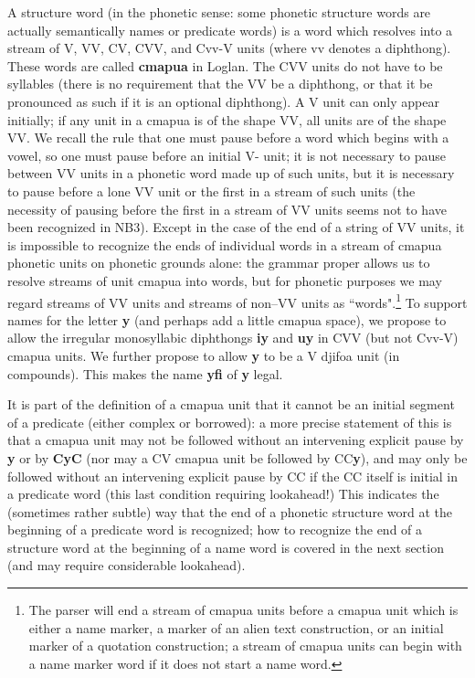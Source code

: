 \documentclass[12pt]{book}
\begin{document}
A structure word (in the phonetic sense:  some phonetic structure words are actually semantically names or predicate words)  is a word which resolves into a stream of
V, VV, CV, CVV, and Cvv-V units (where vv denotes a diphthong).  These words are called {\bf cmapua} in Loglan.  The CVV units do not have to be syllables (there is no requirement
that the VV be a diphthong, or that it be pronounced as such if it is an optional diphthong).  A V unit can only appear initially;  if any unit in a cmapua is of the shape VV, all units are of the shape VV.  We recall the rule that one must pause before
a word which begins with a vowel, so one must pause before an initial V- unit;  it is not necessary to pause between VV units in a phonetic word made up of such units, but it is necessary to pause before a lone VV unit or the first in a stream of such units (the necessity of pausing before the first in a stream of VV units seems not to have been recognized in NB3).  Except in the case of the end of a string of VV units, it is impossible to recognize the ends of individual words in a stream of cmapua phonetic units on phonetic grounds alone:  the grammar proper allows us to resolve streams of unit cmapua into words, but for phonetic purposes we may regard streams of VV units and streams of non--VV units as ``words".\footnote{The parser will end a stream of cmapua units before a cmapua unit which is either a name marker, a marker of an alien text construction, or an initial marker of a quotation construction; a stream of cmapua units can begin with a name marker word if it does not start a name word.}  
To support names for the letter {\bf y} (and perhaps add a little cmapua space), we propose to allow the irregular monosyllabic diphthongs
{\bf iy} and {\bf uy} in CVV (but not Cvv-V) cmapua units.  We further propose to allow {\bf y} to be a V djifoa unit (in compounds).  This makes the
name {\bf yfi} of {\bf y} legal.

It is part of the definition of a cmapua unit that it cannot be an initial segment of a predicate (either complex or borrowed):  a more precise statement of this is that a cmapua unit may not be followed without an intervening explicit pause by {\bf y} or by {\bf CyC} (nor may a CV cmapua unit be followed by CC{\bf y}), and may only be followed without an intervening explicit pause by CC if the CC itself is initial in a predicate word (this last condition requiring lookahead!)  This indicates the (sometimes rather subtle) way that the end of a phonetic structure word at the beginning of a predicate word is recognized;  how to recognize the end of a structure word at the beginning of a name word is covered in the next section (and may require considerable lookahead).
\end{document}
